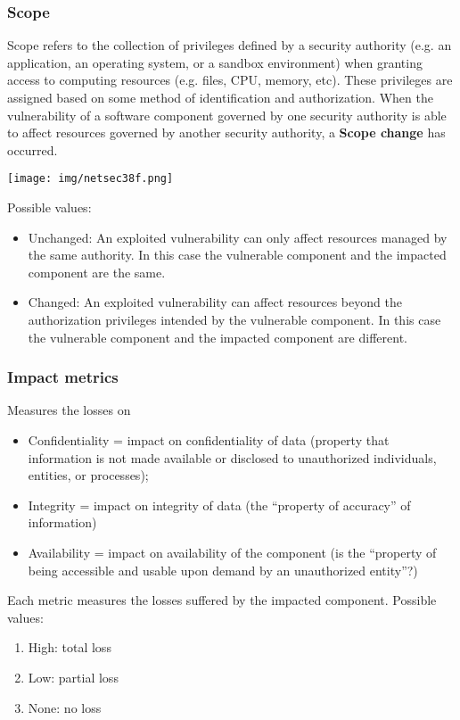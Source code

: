 \documentclass[a4paper, 10pt, titlepage]{article}
\begin{document}
\subsubsection*{Scope}
Scope refers to the collection of privileges defined by a security authority (e.g. an application, an operating system, or a sandbox environment) when granting access to computing resources (e.g. files, CPU, memory, etc). These privileges are assigned based on some method of identification and authorization. When the vulnerability of a software component governed by one security authority is able to affect resources governed by another security authority, a \textbf{Scope change} has occurred.
\begin{center}
	\texttt{[image: img/netsec38f.png]}
\end{center}
Possible values:
\begin{itemize}
	\item Unchanged: An exploited vulnerability can only affect resources managed by the same authority. In this case the vulnerable component and the impacted component are the same.
	\item Changed: An exploited vulnerability can affect resources beyond the authorization privileges intended by the vulnerable component. In this case the vulnerable component and the impacted component are different.
\end{itemize}
 
\subsubsection*{Impact metrics}
Measures the losses on
\begin{itemize}
 	\item Confidentiality = impact on confidentiality of data (property that information is not made available or disclosed to unauthorized individuals, entities, or processes);
 	\item Integrity = impact on integrity of data (the “property of accuracy” of information)
 	\item Availability = impact on availability of the component (is the “property of being accessible and usable upon demand by an unauthorized entity”?)
\end{itemize}
Each metric measures the losses suffered by the impacted component. Possible values:
\begin{enumerate}
	\item High: total loss
	\item Low: partial loss
	\item None: no loss
\end{enumerate}
\end{document}
